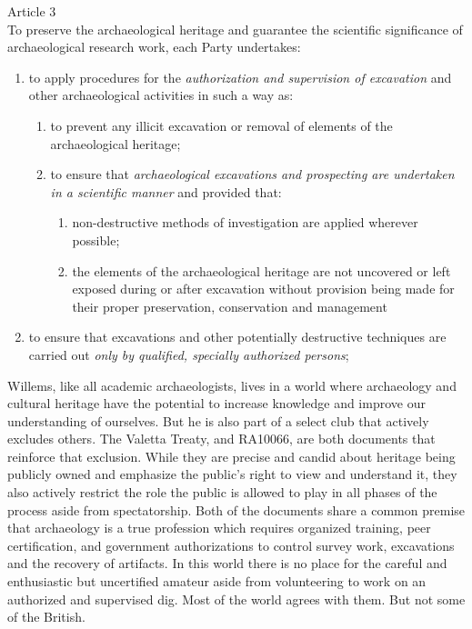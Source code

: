 \documentclass[spanish]{ijsra}
\begin{document}
\begin{displayquote}
	Article 3\\
	To preserve the archaeological heritage and guarantee the scientific significance of archaeological research work, each Party undertakes:
	\begin{enumerate}
		\item to apply procedures for the \textit{authorization and supervision of excavation} and other archaeological activities in such a way as:  
		\begin{enumerate}
			\item to prevent any illicit excavation or removal of elements of the archaeological heritage; 
			\item to ensure that \textit{archaeological excavations and prospecting are undertaken in a scientific manner} and provided that:
			\begin{enumerate}
				\item non-destructive methods of investigation are applied wherever possible;
				\item the elements of the archaeological heritage are not uncovered or left exposed during or after excavation without provision being made for their proper preservation, conservation and management
			\end{enumerate}
		\end{enumerate}
		\item to ensure that excavations and other potentially destructive techniques are carried out \textit{only by qualified, specially authorized persons};
	\end{enumerate}
\end{displayquote}

Willems, like all academic archaeologists, lives in a world where archaeology and cultural heritage have the potential to increase knowledge and improve our understanding of ourselves. But he is also part of a select club that actively excludes others. The Valetta Treaty, and RA10066, are both documents that reinforce that exclusion. While they are precise and candid about heritage being publicly owned and emphasize the public’s right to view and understand it, they also actively restrict the role the public is allowed to play in all phases of the process aside from spectatorship.  Both of the documents share a common premise that archaeology is a true profession which requires organized training, peer certification, and government authorizations to control survey work, excavations and the recovery of artifacts. In this world there is no place for the careful and enthusiastic but uncertified amateur aside from volunteering to work on an authorized and supervised dig. Most of the world agrees with them. But not some of the British.
\end{document}
